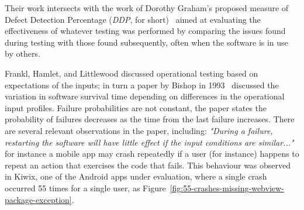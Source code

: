 Their work intersects with the work of Dorothy Graham's proposed measure of Defect Detection Percentage (\emph{DDP}, for short)~\cite{graham_measuring_2009} aimed at evaluating the effectiveness of whatever testing was performed by comparing the issues found during testing with those found subsequently, often when the software is in use by others.

Frankl, Hamlet, and Littlewood discussed operational testing based on expectations of the inputs; in turn a paper by Bishop in 1993~\cite{bishop1993variation} discussed the variation in software survival time depending on differences in the operational input profiles. Failure probabilities are not constant, the paper states the probability of failures decreases as the time from the last failure increases. There are several relevant observations in the paper, including: \emph{"During a failure, restarting the software will have little effect if the input conditions are similar..."} for instance a mobile app may crash repeatedly if a user (for instance) happens to repeat an action that exercises the code that fails. This behaviour was observed in Kiwix, one of the Android apps under evaluation, where a single crash occurred 55 times for a single user, as Figure~\ref{fig:55-crashes-missing-webview-package-exception}.

